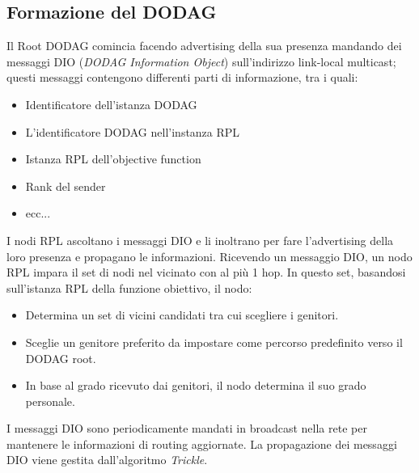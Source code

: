 \documentclass{article}
\begin{document}
\subsection{Formazione del DODAG}
Il Root DODAG comincia facendo advertising della sua presenza mandando dei messaggi DIO (\textit{DODAG Information Object}) sull'indirizzo link-local multicast; questi messaggi contengono differenti parti di informazione, tra i quali: 
\begin{itemize}
    \item Identificatore dell'istanza DODAG
    \item L'identificatore DODAG nell'instanza RPL
    \item Istanza RPL dell'objective function
    \item Rank del sender
    \item ecc...
\end{itemize}
I nodi RPL ascoltano i messaggi DIO e li inoltrano per fare l'advertising della loro presenza e propagano le informazioni. Ricevendo un messaggio DIO, un nodo RPL impara il set di nodi nel vicinato con al più 1 hop. In questo set, basandosi sull'istanza RPL della funzione obiettivo, il nodo: 
\begin{itemize}
    \item Determina un set di vicini candidati tra cui scegliere i genitori.
    \item Sceglie un genitore preferito da impostare come percorso predefinito verso il DODAG root.
    \item In base al grado ricevuto dai genitori, il nodo determina il suo grado personale.
\end{itemize}
I messaggi DIO sono periodicamente mandati in broadcast nella rete per mantenere le informazioni di routing aggiornate. La propagazione dei messaggi DIO viene gestita dall'algoritmo \textit{Trickle}.
\end{document}
